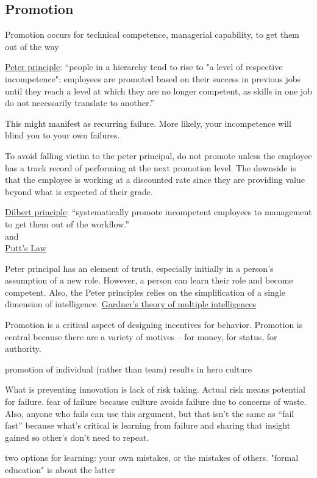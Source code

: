\subsection{Promotion}

Promotion occurs for technical competence, managerial capability, to get them out of the way 


\href{https://en.wikipedia.org/wiki/Peter_principle}{Peter principle}: ``people in a hierarchy tend to rise to "a level of respective incompetence": employees are promoted based on their success in previous jobs until they reach a level at which they are no longer competent, as skills in one job do not necessarily translate to another.''

This might manifest as recurring failure. More likely, your incompetence will blind you to your own failures.

To avoid falling victim to the peter principal, do not promote unless the employee has a track record of performing at the next promotion level. The downside is that the employee is working at a discounted rate since they are providing value beyond what is expected of their grade.


\href{https://en.wikipedia.org/wiki/Dilbert_principle}{Dilbert principle}: ``systematically promote incompetent employees to management to get them out of the workflow.''\\
and\\
\href{https://en.wikipedia.org/wiki/Putt\%27s_Law_and_the_Successful_Technocrat}{Putt's Law}





Peter principal \cite{1970_Peter} has an element of truth, especially initially in a person's assumption of a new role. However, a person can learn their role and become competent. Also, the Peter principles relies on the simplification of a single dimension of intelligence. 
\href{https://en.wikipedia.org/wiki/Theory_of_multiple_intelligences}{Gardner's theory of multiple intelligences}


Promotion is a critical aspect of designing incentives for behavior. Promotion is central because there are a variety of motives -- for money, for status, for authority. 

promotion of individual (rather than team) results in hero culture

What is preventing innovation is lack of risk taking. Actual risk means potential for failure. fear of failure because culture avoids failure due to concerns of waste. Also, anyone who fails can use this argument, but that isn't the same as ``fail fast'' because what's critical is learning from failure and sharing that insight gained so other's don't need to repeat. 

two options for learning: your own mistakes, or the mistakes of others. "formal education" is about the latter

